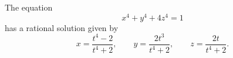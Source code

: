 \begin{proposition}\label{eq:155}
    The equation
\[
    x^4+y^4+4z^4=1
\]
    has a rational solution given by
\[
    x=\frac{t^4-2}{t^4+2},\qquad y=\frac{2t^3}{t^4+2},\qquad z=\frac{2t}{t^4+2}.
\]
\end{proposition}
